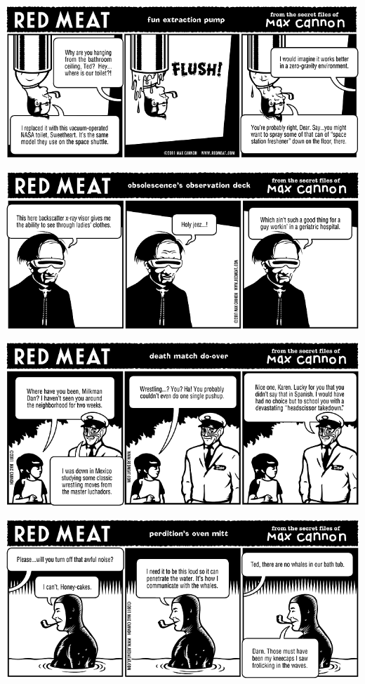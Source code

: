 \documentclass[a4paper,twoside,11pt]{article}
\begin{document}
\includegraphics[width=\textwidth]{redmeat_2011-06-28.png}



\includegraphics[width=\textwidth]{redmeat_2011-07-05.png}



\includegraphics[width=\textwidth]{redmeat_2011-07-12.png}



\includegraphics[width=\textwidth]{redmeat_2011-07-19.png}
\end{document}
